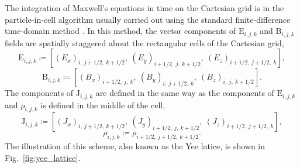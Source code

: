 \documentclass[10pt, a4paper, twoside, openright]{report}
\renewcommand{\vec}[1]{\boldsymbol{\mathrm{#1}}}
\begin{document}
The integration of Maxwell's equations in time on the Cartesian grid is in the particle-in-cell algorithm usually carried out using the standard finite-difference time-domain method \cite{Yee1966}. In this method, the vector components of $ \vec{E}_{i, j, k} $ and $ \vec{B}_{i, j, k} $ fields are spatially staggered about the rectangular cells of the Cartesian grid,
\begin{equation}
	\label{eq:staggered_E}
	\vec{E}_{i, j, k} \coloneqq \left[\left(E_{x}\right)_{i,\: j + 1/2,\: k + 1/2}, \ \left(E_{y}\right)_{i + 1/2,\: j,\: k + 1/2}, \ \left(E_{z}\right)_{i + 1/2,\: j + 1/2,\: k} \right],
\end{equation}
\begin{equation}
	\label{eq:staggered_B}
	\vec{B}_{i, j, k} \coloneqq \left[\left(B_{x}\right)_{i + 1/2,\: j,\: k}, \ \left(B_{y}\right)_{i,\: j + 1/2,\: k}, \ \left(B_{z}\right)_{i,\: j,\: k + 1/2} \right].
\end{equation}
The components of $ \vec{J}_{i, j, k} $ are defined in the same way as the components of $ \vec{E}_{i, j, k} $ and $ \rho_{i, j, k} $ is defined in the middle of the cell,
\begin{equation}\label{eq:staggered_J}
	\vec{J}_{i, j, k} \coloneqq \left[\left(J_{x}\right)_{i,\: j + 1/2,\: k + 1/2}, \ \left(J_{y}\right)_{i + 1/2,\: j,\: k + 1/2}, \ \left(J_{z}\right)_{i + 1/2,\: j + 1/2,\: k} \right],
\end{equation}
\begin{equation}\label{eq:staggered_rho}
	\rho_{i, j, k} \coloneqq \rho_{i + 1/2,\: j + 1/2,\: k + 1/2}.
\end{equation}
The illustration of this scheme, also known as the Yee latice, is shown in Fig.~\ref{fig:yee_lattice}. 
\end{document}
